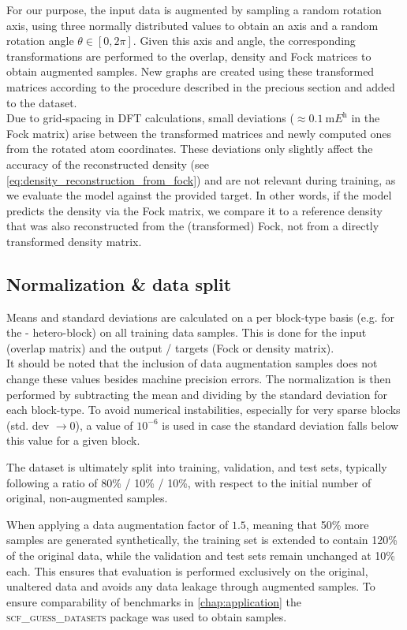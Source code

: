 For our purpose, the input data is augmented by sampling a random rotation axis, using three normally distributed values to obtain an axis and a random rotation angle $\theta \in [0, 2\pi]$. Given this axis and angle, the corresponding transformations are performed to the overlap, density and Fock matrices to obtain augmented samples. New graphs are created using these transformed matrices according to the procedure described in the precious section and added to the dataset. \\
Due to grid-spacing in DFT calculations, small deviations ($\approx \SI{0.1}{\milli\hartree}$ in the Fock matrix) arise between the transformed matrices and newly computed ones from the rotated atom coordinates. These deviations only slightly affect the accuracy of the reconstructed density (see \autoref{eq:density_reconstruction_from_fock}) and are not relevant during training, as we evaluate the model against the provided target. In other words, if the model predicts the density via the Fock matrix, we compare it to a reference density that was also reconstructed from the (transformed) Fock, not from a directly transformed density matrix. %

\subsection{Normalization \& data split}
\label{subsec:gnn_normalization}
Means and standard deviations are calculated on a per block-type basis (e.g. for the - hetero-block) on all training data samples. This is done for the input (overlap matrix) and the output / targets (Fock or density matrix).\\
It should be noted that the inclusion of data augmentation samples does not change these values besides machine precision errors. The normalization is then performed by subtracting the mean and dividing by the standard deviation for each block-type. To avoid numerical instabilities, especially for very sparse blocks (std. dev $\rightarrow 0$), a value of $10^{-6}$ is used in case the standard deviation falls below this value for a given block.

The dataset is ultimately split into training, validation, and test sets, typically following a ratio of 80\% / 10\% / 10\%, with respect to the initial number of original, non-augmented samples.

When applying a data augmentation factor of $1.5$, meaning that 50\% more samples are generated synthetically, the training set is extended to contain 120\% of the original data, while the validation and test sets remain unchanged at 10\% each. This ensures that evaluation is performed exclusively on the original, unaltered data and avoids any data leakage through augmented samples. To ensure comparability of benchmarks in \autoref{chap:application} the \textsc{scf\_guess\_datasets} package was used to obtain samples. \parencite{ref:milacher_scf_guess_datasets}

